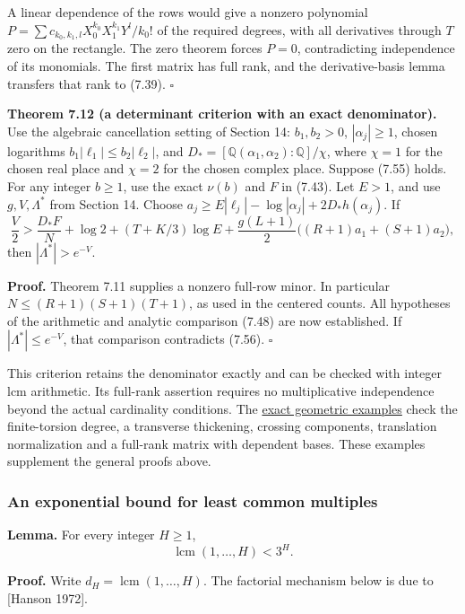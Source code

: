 \documentclass[
  11pt,
  a4paper,
]{article}
\begin{document}
A linear dependence of the rows would give a nonzero polynomial
\(P=\sum c_{k_0,k_1,l}X_0^{k_0}X_1^{k_1}Y^l/k_0!\) of the required
degrees, with all derivatives through \(T\) zero on the rectangle. The
zero theorem forces \(P=0\), contradicting independence of its
monomials. The first matrix has full rank, and the derivative-basis
lemma transfers that rank to (7.39). \(\square\)

\textbf{Theorem 7.12 (a determinant criterion with an exact
denominator).} Use the algebraic cancellation setting of Section 14:
\(b_1,b_2>0\), \(|\alpha_j|\ge1\), chosen logarithms
\(b_1|\ell_1|\le b_2|\ell_2|\), and
\(D_*=[\mathbb Q(\alpha_1,\alpha_2):\mathbb Q]/\chi\), where \(\chi=1\)
for the chosen real place and \(\chi=2\) for the chosen complex place.
Suppose (7.55) holds. For any integer \(b\ge1\), use the exact
\(\nu(b)\) and \(F\) in (7.43). Let \(E>1\), and use \(g,V,\Lambda^*\)
from Section 14. Choose
\(a_j\ge E|\ell_j|-\log|\alpha_j|+2D_*h(\alpha_j)\). If \[
\frac V2>
\frac{D_*F}{N}+\log2+(T+K/3)\log E+
\frac{g(L+1)}2\big((R+1)a_1+(S+1)a_2\big),
\tag{7.56}
\] then \(|\Lambda^*|>e^{-V}\).

\textbf{Proof.} Theorem 7.11 supplies a nonzero full-row minor. In
particular \(N\le(R+1)(S+1)(T+1)\), as used in the centered counts. All
hypotheses of the arithmetic and analytic comparison (7.48) are now
established. If \(|\Lambda^*|\le e^{-V}\), that comparison contradicts
(7.56). \(\square\)

This criterion retains the denominator exactly and can be checked with
integer lcm arithmetic. Its full-rank assertion requires no
multiplicative independence beyond the actual cardinality conditions.
The \href{https://kokunoyumeto.github.io/open-math-courses-public/courses/TR-BAKER/verification/gouillon_geometry.py}{exact geometric
examples} check the finite-torsion degree, a transverse thickening,
crossing components, translation normalization and a full-rank matrix
with dependent bases. These examples supplement the general proofs
above.

\subsubsection{An exponential bound for least common
multiples}\label{an-exponential-bound-for-least-common-multiples}

\textbf{Lemma.} For every integer \(H\ge1\), \[
\operatorname{lcm}(1,\ldots,H)<3^H.
\]

\textbf{Proof.} Write \(d_H=\operatorname{lcm}(1,\ldots,H)\). The
factorial mechanism below is due to {[}Hanson 1972{]}.
\end{document}
